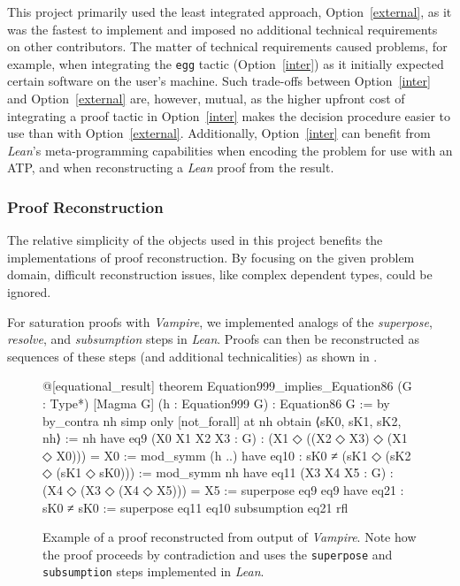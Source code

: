 This project primarily used the least integrated approach, Option~\ref{external}, as it was the fastest to implement and imposed no additional technical requirements on other contributors.
The matter of technical requirements caused problems, for example, when integrating the \texttt{egg} tactic (Option~\ref{inter}) as it initially expected certain software on the user's machine.
Such trade-offs between Option~\ref{inter} and Option~\ref{external} are, however, mutual, as the higher upfront cost of integrating a proof tactic in Option~\ref{inter} makes the decision procedure easier to use than with Option~\ref{external}.
Additionally, Option~\ref{inter} can benefit from \emph{Lean}'s meta-programming capabilities when encoding the problem for use with an ATP, and when reconstructing a \emph{Lean} proof from the result.

\subsubsection{Proof Reconstruction}
The relative simplicity of the objects used in this project benefits the implementations of proof reconstruction.
By focusing on the given problem domain, difficult reconstruction issues, like complex dependent types, could be ignored.

For saturation proofs with \emph{Vampire}, we implemented analogs of the \emph{superpose}, \emph{resolve}, and \emph{subsumption} steps in \emph{Lean}.
Proofs can then be reconstructed as sequences of these steps (and additional technicalities) as shown in .

\begin{figure}
\centering
\begin{lean}
@[equational_result] theorem Equation999_implies_Equation86
    (G : Type*) [Magma G] (h : Equation999 G) : Equation86 G := by
  by_contra nh
  simp only [not_forall] at nh
  obtain ⟨sK0, sK1, sK2, nh⟩ := nh
  have eq9 (X0 X1 X2 X3 : G) : (X1 ◇ ((X2 ◇ X3) ◇ (X1 ◇ X0))) = X0 :=
    mod_symm (h ..)
  have eq10 : sK0 ≠ (sK1 ◇ (sK2 ◇ (sK1 ◇ sK0))) := mod_symm nh
  have eq11 (X3 X4 X5 : G) : (X4 ◇ (X3 ◇ (X4 ◇ X5))) = X5 := superpose eq9 eq9
  have eq21 : sK0 ≠ sK0 := superpose eq11 eq10
  subsumption eq21 rfl
\end{lean}
\caption{Example of a proof reconstructed from output of \emph{Vampire}. Note how the proof proceeds by contradiction and uses the \texttt{superpose} and \texttt{subsumption} steps implemented in \emph{Lean}.}
\label{fig:vampire-example}
\end{figure}

